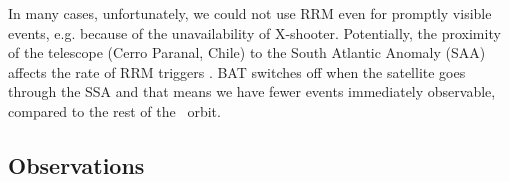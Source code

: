 \documentclass[longauth]{aa}    %
\begin{document}
In many cases, unfortunately, we could not use RRM even for promptly visible
events, e.g.{} because of the unavailability of X-shooter. Potentially, the
proximity of the telescope (Cerro Paranal, Chile) to the South Atlantic Anomaly
(SAA) affects the rate of RRM triggers \citep{Greiner2011}. BAT switches off
when the satellite goes through the SSA and that means we have fewer events
immediately observable, compared to the rest of the \swift~orbit.


\subsection{Observations} \label{obs}
\end{document}

